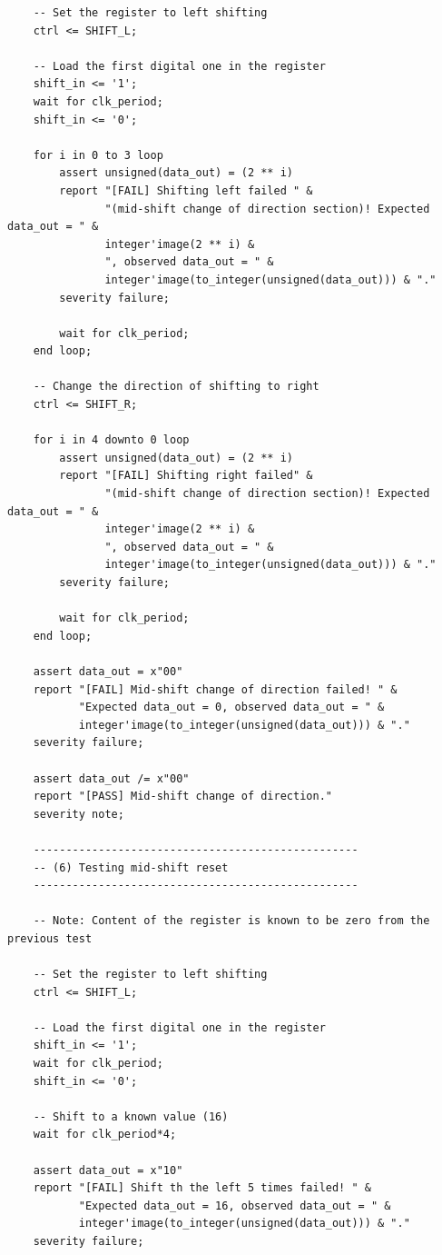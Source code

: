 \documentclass[10pt]{article}
\begin{document}
\begin{verbatim}
    -- Set the register to left shifting
    ctrl <= SHIFT_L; 
   
    -- Load the first digital one in the register
    shift_in <= '1'; 
    wait for clk_period;
    shift_in <= '0';
    
    for i in 0 to 3 loop
        assert unsigned(data_out) = (2 ** i)
        report "[FAIL] Shifting left failed " &
               "(mid-shift change of direction section)! Expected data_out = " &
               integer'image(2 ** i) &
               ", observed data_out = " & 
               integer'image(to_integer(unsigned(data_out))) & "."
        severity failure;
        
        wait for clk_period;
    end loop;
    
    -- Change the direction of shifting to right
    ctrl <= SHIFT_R; 
    
    for i in 4 downto 0 loop
        assert unsigned(data_out) = (2 ** i)
        report "[FAIL] Shifting right failed" &
               "(mid-shift change of direction section)! Expected data_out = " &
               integer'image(2 ** i) &
               ", observed data_out = " & 
               integer'image(to_integer(unsigned(data_out))) & "."
        severity failure;
        
        wait for clk_period;
    end loop;
    
    assert data_out = x"00"
    report "[FAIL] Mid-shift change of direction failed! " &
           "Expected data_out = 0, observed data_out = " & 
           integer'image(to_integer(unsigned(data_out))) & "."
    severity failure;

    assert data_out /= x"00"
    report "[PASS] Mid-shift change of direction."
    severity note;
    
    --------------------------------------------------
    -- (6) Testing mid-shift reset
    --------------------------------------------------
    
    -- Note: Content of the register is known to be zero from the previous test
        
    -- Set the register to left shifting
    ctrl <= SHIFT_L; 
   
    -- Load the first digital one in the register
    shift_in <= '1'; 
    wait for clk_period;
    shift_in <= '0';
    
    -- Shift to a known value (16)
    wait for clk_period*4; 
    
    assert data_out = x"10"
    report "[FAIL] Shift th the left 5 times failed! " &
           "Expected data_out = 16, observed data_out = " & 
           integer'image(to_integer(unsigned(data_out))) & "."
    severity failure;
    

\end{verbatim}
\end{document}
